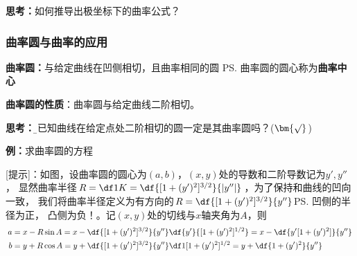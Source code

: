 {\bf 思考：}如何推导出极坐标下的曲率公式？

\subsubsection{曲率圆与曲率的应用}

{\bf 曲率圆：}与给定曲线在凹侧相切，且曲率相同的圆
\ps{曲率圆的圆心称为{\bf 曲率中心}}

\begin{thx}
	{\bf 曲率圆的性质}：曲率圆与给定曲线二阶相切。
\end{thx}

{\bf 思考：}{\b 与已知曲线在给定点处二阶相切的圆一定是其曲率圆吗？(${\bm{\surd}}$)}

{\bf 例：}求曲率圆的方程

\begin{center}
\end{center}

[提示]：如图，设曲率圆的圆心为$(a,b)$，$(x,y)$处的导数和二阶导数记为$y',y''$，
显然曲率半径$R=\df1K=\df{[1+(y')^2]^{3/2}}{|y''|}$，为了保持和曲线的凹向一致，
我们将曲率半径定义为有方向的$R=\df{[1+(y')^2]^{3/2}}{y''}$\ps{凹侧的半径为正，
凸侧为负！}。记$(x,y)$处的切线与$x$轴夹角为$A$，则
\begin{align}
	a&=x-R\sin A=x-\df{[1+(y')^2]^{3/2}}{y''}\df{y'}{[1+(y')^2]^{1/2}}
	=x-\df{y'[1+(y')^2]}{y''}\notag\\
	b&=y+R\cos A=y+\df{[1+(y')^2]^{3/2}}{y''}\df1{[1+(y')^2]^{1/2}}
	=y+\df{1+(y')^2}{y''}\notag
\end{align}


